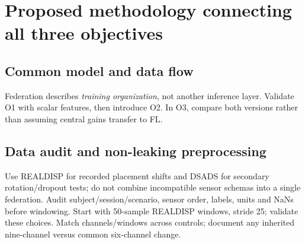 \documentclass[10pt]{article}
\begin{document}
\clearpage
\section*{Proposed methodology connecting all three objectives}
\subsection*{Common model and data flow}
\begin{center}
\end{center}
Federation describes \emph{training organization}, not another inference layer. Validate O1 with scalar features, then introduce O2. In O3, compare both versions rather than assuming central gains transfer to FL.

\subsection*{Data audit and non-leaking preprocessing}
Use REALDISP for recorded placement shifts and DSADS for secondary rotation/dropout tests; do not combine incompatible sensor schemas into a single federation. Audit subject/session/scenario, sensor order, labels, units and NaNs before windowing. Start with 50-sample REALDISP windows, stride 25; validate these choices. Match channels/windows across controls; document any inherited nine-channel versus common six-channel change.
\end{document}
